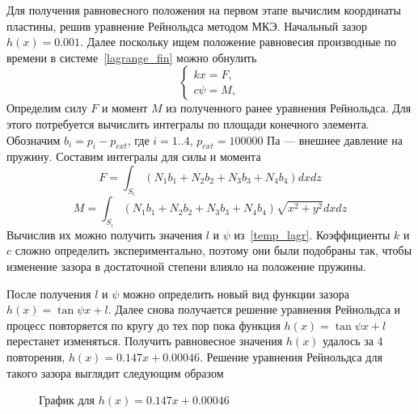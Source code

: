 \documentclass[a4paper,14pt]{extarticle}
\begin{document}
Для получения равновесного положения на первом этапе вычислим координаты пластины, решив уравнение Рейнольдса методом МКЭ. Начальный зазор $h(x) = 0.001$.
Далее поскольку ищем положение равновесия производные по времени в системе~\eqref{lagrange_fin} можно обнулить
\begin{equation}
	\begin{cases*}
		k x = F, \\
		c \psi = M,
	\end{cases*}
\label{temp_lagr}
\end{equation}
Определим силу $F$ и момент $M$ из полученного ранее уравнения Рейнольдса. Для этого потребуется вычислить интегралы по площади конечного элемента. Обозначим $b_i = p_i - p_{ext}$, где $i = 1..4$, $p_{ext} = 100000$ Па --- внешнее давление на пружину. Составим интегралы для силы и момента
\begin{equation*}
	F = \int_{S_i} { \left( N_1 b_1 + N_2 b_2 + N_3 b_3 + N_4 b_4 \right)  dx dz}
\end{equation*}
\begin{equation*}
	M = \int_{S_i} { \left( N_1 b_1 + N_2 b_2 + N_3 b_3 + N_4 b_4 \right) \sqrt{x^2 + y^2}  dx dz}
\end{equation*}
Вычислив их можно получить значения $l$ и $\psi$ из~\eqref{temp_lagr}. Коэффициенты $k$ и $c$ сложно определить экспериментально, поэтому они были подобраны так, чтобы изменение зазора в достаточной степени влияло на положение пружины.

После получения  $l$ и $\psi$ можно определить новый вид функции зазора $h(x) = \tan{\psi} x + l$. Далее снова получается решение уравнения Рейнольдса и процесс повторяется по кругу до тех пор пока функция  $h(x) = \tan{\psi} x + l$ перестанет изменяться. Получить равновесное значения $h(x)$ удалось за 4 повторения, $h(x) = 0.147 x + 0.00046$. Решение уравнения Рейнольдса для такого зазора выглядит следующим образом
\begin{figure}[!htbp]
	\caption{График для $h(x) = 0.147 x + 0.00046$}
	\label{part_2-zazor}
\end{figure}
\end{document}
